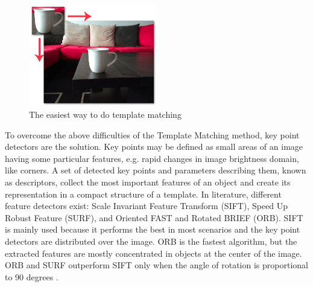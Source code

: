 \documentclass{article}
\begin{document}
\begin{figure}[H]
    \centering
     \includegraphics[width=0.5\textwidth]{image/template_matching_sliding.png}
    \caption{The easiest way to do template matching}
\end{figure}

To overcome the above difficulties of the Template Matching method, key point detectors are the solution. Key points may be defined as small areas of an image having some particular features, e.g. rapid changes in image brightness domain, like corners. A set of detected key points and parameters describing them, known as descriptors, collect the most important features of an object and create its representation in a compact structure of a template. In literature, different feature detectors exist: Scale Invariant Feature Transform (SIFT), Speed Up Robust Feature (SURF), and Oriented FAST and Rotated BRIEF (ORB).
SIFT is mainly used because it performs the best in most scenarios and the key point detectors are distributed over the image. ORB is the fastest algorithm, but the extracted features are mostly concentrated in objects at the center of the image. ORB and SURF outperform SIFT only when the angle of rotation is proportional to 90 degrees \cite{karami_prasad_shehata_2017}.\\
\end{document}
